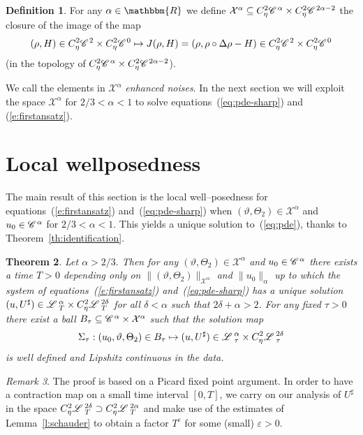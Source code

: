 \documentclass{amsart}
\newcommand{\tmtextit}[1]{{\itshape{#1}}}
\newtheorem{theorem}{Theorem}
\theoremstyle{remark}
\newtheorem{remark}[theorem]{Remark}
\theoremstyle{definition}
\newtheorem{definition}[theorem]{Definition}
\newcommand{\CC}{\mathscr{C} \hspace{.1em}}
\newcommand{\LL}{\mathscr{L} \hspace{.2em}}
\begin{document}
\begin{definition}
  For any $\alpha \in \mathbbm{R}$ we define $\mathcal{X}^{\alpha} \subseteq
  C^2_{\eta} \CC^{\alpha} \times C^2_{\eta} \CC^{2 \alpha - 2}$ the closure of
  the image of the map
  \[ (\rho, H) \in C^2_{\eta} \CC^2 \times C^2_{\eta} \CC^0 \mapsto J (\rho,
     H) = (\rho, \rho \circ \Delta \rho - H) \in C^2_{\eta} \CC^2 \times
     C^2_{\eta} \CC^0 \]
  (in the topology of $C^2_{\eta} \CC^{\alpha} \times C^2_{\eta} \CC^{2 \alpha
  - 2}$).
\end{definition}

We call the elements in $\mathcal{X}^{\alpha}$ \tmtextit{enhanced noises}. In
the next section we will exploit the space $\mathcal{X}^{\alpha}$ for $2 / 3 <
\alpha < 1$ to solve equations~(\ref{eq:pde-sharp}) and (\ref{e:firstansatz}).
\

\section{Local wellposedness\label{s:fixpoint}}

The main result of this section is the local well--posedness for
equations~(\ref{e:firstansatz}) and~(\ref{eq:pde-sharp}) when $(\vartheta,
\Theta_2) \in \mathcal{X}^{\alpha}$ and $u_0 \in \CC^{\alpha}$ for $2 / 3 <
\alpha < 1$. This yields a unique solution to~(\ref{eq:pde}), thanks to
Theorem~\ref{th:identification}.

\begin{theorem}
  \label{t:well-posed}Let $\alpha > 2 / 3.$ Then for any $(\vartheta,
  \Theta_2) \in \mathcal{X}^{\alpha}$ and $u_0 \in \CC^{\alpha}$ there exists
  a time $T > 0$ depending only on $\| (\vartheta, \Theta_2)
  \|_{\mathcal{X}^{\alpha}}$ and $\| u_0 \|_{\alpha}$ up to which the system
  of equations~(\ref{e:firstansatz}) and~(\ref{eq:pde-sharp}) has a unique
  solution $(u, U^{\sharp}) \in \LL^{\alpha}_T \times C_{\eta}^2 \LL^{2
  \delta}_T$ for all $\delta < \alpha$ such that $2 \delta + \alpha > 2$. For
  any fixed $\tau > 0$ there exist a ball $B_{\tau} \subseteq \CC^{\alpha}
  \times \mathcal{X}^{\alpha}$ such that the solution map
  \[ \Sigma_{\tau} : (u_0, \vartheta, \Theta_2) \in B_{\tau} \mapsto (u,
     U^{\sharp}) \in \LL^{\alpha}_{\tau} \times C_{\eta}^2 \LL^{2
     \delta}_{\tau} \]
  is well defined and Lipshitz continuous in the data. 
\end{theorem}

\begin{remark}
  The proof is based on a Picard fixed point argument. In order to have a
  contraction map on a small time interval $[0, T]$, we carry on our analysis
  of $U^{\sharp}$ in the space $C_{\eta}^2 \LL^{2 \delta}_T \supset C_{\eta}^2
  \LL^{2 \alpha}_T$ and make use of the estimates of Lemma~\ref{l:schauder} to
  obtain a factor $T^{\varepsilon}$ for some (small) $\varepsilon > 0$.
\end{remark}
\end{document}
